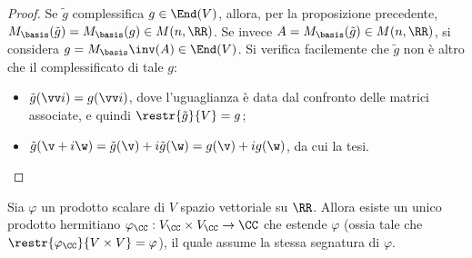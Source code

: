 \documentclass[11pt]{article}
\begin{document}
	\begin{proof}
		Se $\tilde g$ complessifica $g \in \End(V)$, allora, per la proposizione precedente,
		$M_\basis(\tilde g) = M_\basis(g) \in M(n, \RR)$. Se invece $A = M_\basis(\tilde g) \in M(n, \RR)$,
		si considera $g = M_\basis\inv(A) \in \End(V)$. Si verifica facilemente che $\tilde g$ non è altro che
		il complessificato di tale $g$:
		
		\begin{itemize}
			\item $\tilde g (\vv i) = g(\vv i)$, dove l'uguaglianza è data dal confronto delle matrici associate,
			e quindi $\restr{\tilde g}{V} = g$;
			\item $\tilde g(\v + i\w) = \tilde g(\v) + i \tilde g(\w) = g(\v) + i g(\w)$, da cui la tesi.
		\end{itemize}
	\end{proof}

	\begin{proposition}
		Sia $\varphi$ un prodotto scalare di $V$ spazio vettoriale su $\RR$. Allora esiste un
		unico prodotto hermitiano $\varphi_\CC : V_\CC \times V_\CC \to \CC$ che estende $\varphi$ (ossia tale che
		$\restr{\varphi_\CC}{V \times V} = \varphi$), il quale assume la stessa segnatura
		di $\varphi$.
	\end{proposition}
\end{document}

